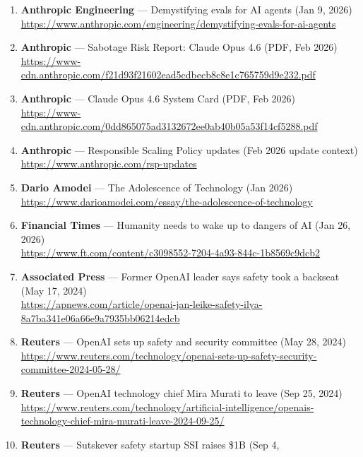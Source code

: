 \documentclass[11pt]{article}
\begin{document}
\begin{enumerate}
  \textbf{Anthropic Engineering} --- Effective context engineering for
  AI agents (Sep 29, 2025)\\
  \url{https://www.anthropic.com/engineering/effective-context-engineering-for-ai-agents}
\item
  \textbf{Anthropic Engineering} --- Demystifying evals for AI agents
  (Jan 9, 2026)\\
  \url{https://www.anthropic.com/engineering/demystifying-evals-for-ai-agents}
\item
  \textbf{Anthropic} --- Sabotage Risk Report: Claude Opus 4.6 (PDF, Feb
  2026)\\
  \url{https://www-cdn.anthropic.com/f21d93f21602ead5cdbecb8c8e1c765759d9e232.pdf}
\item
  \textbf{Anthropic} --- Claude Opus 4.6 System Card (PDF, Feb 2026)\\
  \url{https://www-cdn.anthropic.com/0dd865075ad3132672ee0ab40b05a53f14cf5288.pdf}
\item
  \textbf{Anthropic} --- Responsible Scaling Policy updates (Feb 2026
  update context)\\
  \url{https://www.anthropic.com/rsp-updates}
\item
  \textbf{Dario Amodei} --- The Adolescence of Technology (Jan 2026)\\
  \url{https://www.darioamodei.com/essay/the-adolescence-of-technology}
\item
  \textbf{Financial Times} --- Humanity needs to wake up to dangers of
  AI (Jan 26, 2026)\\
  \url{https://www.ft.com/content/c3098552-7204-4a93-844c-1b8569c9dcb2}
\item
  \textbf{Associated Press} --- Former OpenAI leader says safety took a
  backseat (May 17, 2024)\\
  \url{https://apnews.com/article/openai-jan-leike-safety-ilya-8a7ba341e06a66e9a7935bb06214edcb}
\item
  \textbf{Reuters} --- OpenAI sets up safety and security committee (May
  28, 2024)\\
  \url{https://www.reuters.com/technology/openai-sets-up-safety-security-committee-2024-05-28/}
\item
  \textbf{Reuters} --- OpenAI technology chief Mira Murati to leave (Sep
  25, 2024)\\
  \url{https://www.reuters.com/technology/artificial-intelligence/openais-technology-chief-mira-murati-leave-2024-09-25/}
\item
  \textbf{Reuters} --- Sutskever safety startup SSI raises \$1B (Sep 4,

\end{enumerate}
\end{document}

